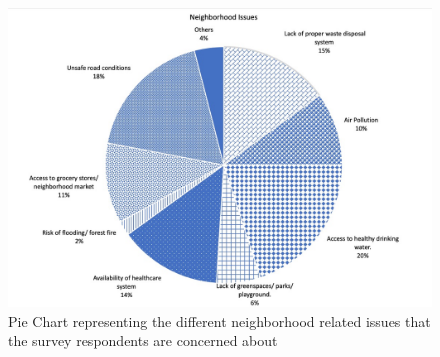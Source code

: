 \documentclass[a4paper, 11pt]{article}
\begin{document}
	\begin{figure}[h!]
	\centering
	\includegraphics[width=\linewidth]{Pie_new.jpg}
		\caption{Pie Chart representing the different neighborhood related issues that the survey respondents are concerned about} 
		\label{fig:Pie}
	\end{figure}
%
\end{document}
